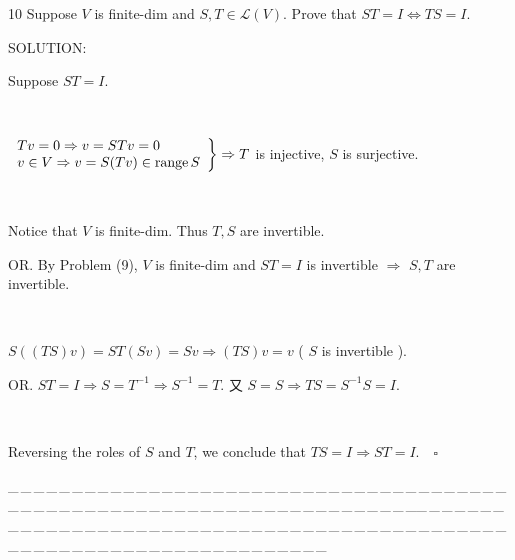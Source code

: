 \documentclass[a4paper, 11pt, UTF8]{article}
\def\range{\textup{range}\,}
\def\Lm{\mathcal{L}}
\begin{document}
\begin{large}
{\timesbf\Large 10} {\timessl\Large 
Suppose $V$ is finite-dim and $S,T\in\Lm(V).$ Prove that $ST=I\Longleftrightarrow TS=I.$
}\par
{\timesbf S\footnotesize{OLUTION:}}\par\quad
Suppose $ST=I$.
\par{\tiny\,\par}\quad
$\left.\begin{array}{l} Tv=0\Rightarrow v=STv=0\\ v\in V\Rightarrow v=S(Tv)\in\range S\end{array}\right\}\Rightarrow T$ is injective, $S$ is surjective.\par{\tiny\,\par}\quad
Notice that $V$ is finite-dim. Thus $T,S$ are invertible.\par\quad
O{\small R. By Problem (9), $V$ is finite-dim and $ST=I$ is invertible $\Rightarrow$ $S,T$ are invertible.}\par{\tiny\,\par}\quad
$S((TS)v)=ST(Sv)=Sv\Rightarrow (TS)v=v$ ( $S$ is invertible ).\par\quad
O{\small R. $ST=I\Rightarrow S=T^{-1}\Rightarrow S^{-1}=T.$ 又 $S=S\Rightarrow TS=S^{-1}S=I$.}\par{\tiny\,\par}\quad
Reversing the roles of $S$ and $T$, we conclude that $TS=I\Rightarrow ST=I.\quad\square$\par
{\tiny \_\,\_\,\_\,\_\,\_\,\_\,\_\,\_\,\_\,\_\,\_\,\_\,\_\,\_\,\_\,\_\,\_\,\_\,\_\,\_\,\_\,\_\,\_\,\_\,\_\,\_\,\_\,\_\,\_\,\_\,\_\,\_\,\_\,\_\,\_\,\_\,\_\,\_\,\_\,\_\,\_\,\_\,\_\,\_\,\_\,\_\,\_\,\_\,\_\,\_\,\_\,\_\,\_\,\_\,\_\,\_\,\_\,\_\,\_\,\_\,\_\,\_\,\_\,\_\,\_\,\_\,\_\,\_\,\_\,\_\,\_\_\,\_\,\_\,\_\,\_\,\_\,\_\,\_\,\_\,\_\,\_\,\_\,\_\,\_\,\_\,\_\,\_\,\_\,\_\,\_\,\_\,\_\,\_\,\_\,\_\,\_\,\_\,\_\,\_\,\_\,\_\,\_\,\_\,\_\,\_\,\_\,\_\,\_\,\_\,\_\,\_\,\_\,\_\,\_\,\_\,\_\,\_\,\_\,\_\,\_\,\_\,\_\,\_\,\_\,\_\,\_\,\_\,\_\,\_\,\_\,\_\,\_\,\_\,\_\,\_\,\_\,\_\,\_\,\_\,\_\,\_}\par


\end{large}
\end{document}
